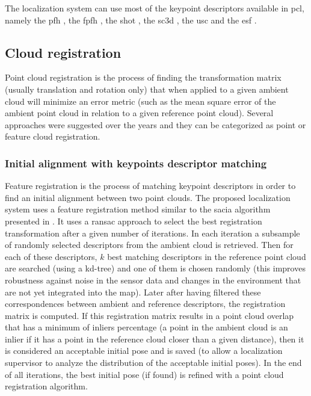 The localization system can use most of the keypoint descriptors available in \gls{pcl}, namely the \gls{pfh} \cite{Rusu2008a}, the \gls{fpfh} \cite{Rusu2009}, the \gls{shot} \cite{Tombari2011}, the \gls{sc3d} \cite{Frome2004}, the \gls{usc} \cite{Tombari2010} and the \gls{esf} \cite{Wohlkinger2011}.


\subsection{Cloud registration}

Point cloud registration is the process of finding the transformation matrix (usually translation and rotation only) that when applied to a given ambient cloud will minimize an error metric (such as the mean square error of the ambient point cloud in relation to a given reference point cloud). Several approaches were suggested over the years and they can be categorized as point or feature cloud registration.


\subsubsection{Initial alignment with keypoints descriptor matching}\label{subsec:localization-system_feature-registration}

Feature registration is the process of matching keypoint descriptors in order to find an initial alignment between two point clouds. The proposed localization system uses a feature registration method similar to the \gls{sacia} algorithm presented in \cite{Rusu2009}. It uses a \gls{ransac} approach to select the best registration transformation after a given number of iterations. In each iteration a subsample of randomly selected descriptors from the ambient cloud is retrieved. Then for each of these descriptors, $k$ best matching descriptors in the reference point cloud are searched (using a kd-tree) and one of them is chosen randomly (this improves robustness against noise in the sensor data and changes in the environment that are not yet integrated into the map). Later after having filtered these correspondences between ambient and reference descriptors, the registration matrix is computed. If this registration matrix results in a point cloud overlap that has a minimum of inliers percentage (a point in the ambient cloud is an inlier if it has a point in the reference cloud closer than a given distance), then it is considered an acceptable initial pose and is saved (to allow a localization supervisor to analyze the distribution of the acceptable initial poses). In the end of all iterations, the best initial pose (if found) is refined with a point cloud registration algorithm.



